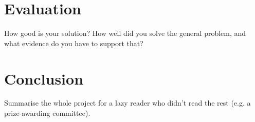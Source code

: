 \documentclass{l4proj}
\begin{document}





\chapter{Evaluation} 
How good is your solution? How well did you solve the general problem, and what evidence do you have to support that?



\chapter{Conclusion}    
Summarise the whole project for a lazy reader who didn't read the rest (e.g. a prize-awarding committee).

%
% 
\end{document}
